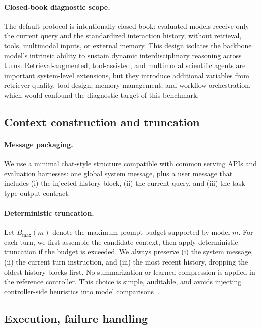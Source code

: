 \paragraph{Closed-book diagnostic scope.}
The default protocol is intentionally closed-book: evaluated models receive only the current query and the standardized interaction history, without retrieval, tools, multimodal inputs, or external memory.
This design isolates the backbone model's intrinsic ability to sustain dynamic interdisciplinary reasoning across turns.
Retrieval-augmented, tool-assisted, and multimodal scientific agents are important system-level extensions, but they introduce additional variables from retriever quality, tool design, memory management, and workflow orchestration, which would confound the diagnostic target of this benchmark.

\subsection{Context construction and truncation}
\label{app:controller_context}

\paragraph{Message packaging.}
We use a minimal chat-style structure compatible with common serving APIs and evaluation harnesses:
one global system message, plus a user message that includes (i) the injected history block, (ii) the current query, and (iii) the task-type output contract.

\paragraph{Deterministic truncation.}
\label{app:controller_truncation}
Let $B_{\max}(m)$ denote the maximum prompt budget supported by model $m$.
For each turn, we first assemble the candidate context, then apply deterministic truncation if the budget is exceeded.
We always preserve (i) the system message, (ii) the current turn instruction, and (iii) the most recent history, dropping the oldest history blocks first.
No summarization or learned compression is applied in the reference controller.
This choice is simple, auditable, and avoids injecting controller-side heuristics into model comparisons~\citep{liang2022helm,eval-harness}.

\subsection{Execution, failure handling}
\label{app:controller_execution}

